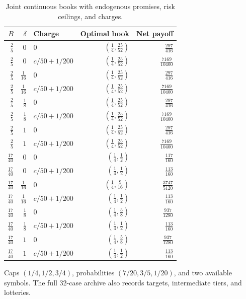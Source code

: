\begin{table}[p]\centering\small
\caption{Joint continuous books with endogenous promises, risk ceilings, and charges.}\label{tab:r42-joint}
\begin{tabular}{rrlrr}\toprule
$B$ & $\delta$ & Charge & Optimal book & Net payoff\\\midrule
$\frac{2}{5}$ & $0$ & $0$ & $(\frac{1}{4},\frac{25}{52})$ & $\frac{297}{416}$\\[3pt]
$\frac{2}{5}$ & $0$ & $c/50+1/200$ & $(\frac{1}{4},\frac{25}{52})$ & $\frac{7169}{10400}$\\[3pt]
$\frac{2}{5}$ & $\frac{1}{16}$ & $0$ & $(\frac{1}{4},\frac{25}{52})$ & $\frac{297}{416}$\\[3pt]
$\frac{2}{5}$ & $\frac{1}{16}$ & $c/50+1/200$ & $(\frac{1}{4},\frac{25}{52})$ & $\frac{7169}{10400}$\\[3pt]
$\frac{2}{5}$ & $\frac{1}{8}$ & $0$ & $(\frac{1}{4},\frac{25}{52})$ & $\frac{297}{416}$\\[3pt]
$\frac{2}{5}$ & $\frac{1}{8}$ & $c/50+1/200$ & $(\frac{1}{4},\frac{25}{52})$ & $\frac{7169}{10400}$\\[3pt]
$\frac{2}{5}$ & $1$ & $0$ & $(\frac{1}{4},\frac{25}{52})$ & $\frac{297}{416}$\\[3pt]
$\frac{2}{5}$ & $1$ & $c/50+1/200$ & $(\frac{1}{4},\frac{25}{52})$ & $\frac{7169}{10400}$\\[3pt]
$\frac{17}{40}$ & $0$ & $0$ & $(\frac{1}{4},\frac{1}{2})$ & $\frac{117}{160}$\\[3pt]
$\frac{17}{40}$ & $0$ & $c/50+1/200$ & $(\frac{1}{4},\frac{1}{2})$ & $\frac{113}{160}$\\[3pt]
$\frac{17}{40}$ & $\frac{1}{16}$ & $0$ & $(\frac{1}{4},\frac{9}{16})$ & $\frac{3747}{5120}$\\[3pt]
$\frac{17}{40}$ & $\frac{1}{16}$ & $c/50+1/200$ & $(\frac{1}{4},\frac{1}{2})$ & $\frac{113}{160}$\\[3pt]
$\frac{17}{40}$ & $\frac{1}{8}$ & $0$ & $(\frac{1}{4},\frac{5}{8})$ & $\frac{937}{1280}$\\[3pt]
$\frac{17}{40}$ & $\frac{1}{8}$ & $c/50+1/200$ & $(\frac{1}{4},\frac{1}{2})$ & $\frac{113}{160}$\\[3pt]
$\frac{17}{40}$ & $1$ & $0$ & $(\frac{1}{4},\frac{5}{8})$ & $\frac{937}{1280}$\\[3pt]
$\frac{17}{40}$ & $1$ & $c/50+1/200$ & $(\frac{1}{4},\frac{1}{2})$ & $\frac{113}{160}$\\[3pt]
\bottomrule\end{tabular}
\par\smallskip\begin{minipage}{.96\textwidth}\footnotesize Caps $(1/4,1/2,3/4)$, probabilities $(7/20,3/5,1/20)$, and two available symbols. The full 32-case archive also records targets, intermediate tiers, and lotteries.\end{minipage}
\end{table}\clearpage
